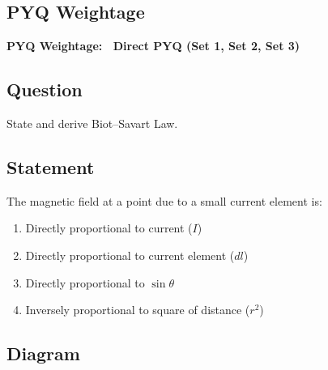 \documentclass[11pt,a4paper]{article}
\begin{document}
\subsection*{PYQ Weightage}
\begin{tcolorbox}[colback=yellow!10!white, colframe=orange, halign=center]
    \textbf{PYQ Weightage: \textasteriskcentered\textasteriskcentered\textasteriskcentered\textasteriskcentered\textasteriskcentered\ Direct PYQ (Set 1, Set 2, Set 3)}
\end{tcolorbox}

\subsection*{Question}
State and derive Biot--Savart Law.

\subsection*{Statement}
The magnetic field at a point due to a small current element is:
\begin{enumerate}
    \item Directly proportional to current (\( I \))
    \item Directly proportional to current element (\( dl \))
    \item Directly proportional to \( \sin\theta \)
    \item Inversely proportional to square of distance (\( r^2 \))
\end{enumerate}

\subsection*{Diagram}
\begin{center}
\end{center}
\end{document}
